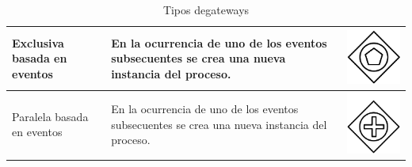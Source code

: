 \begin{table}[H]
\begin{tabular}{|p{2cm}|p{9.5cm}|p{1.7cm} |}
		
		\hline
		{\small Exclusiva basada en eventos } & {\small En la ocurrencia de uno de los eventos subsecuentes se crea una nueva instancia del proceso.} & \vspace{0.5mm} \hspace{2mm} \includegraphics[scale=0.1]{Capitulo2/imagenes/gatewayEBE} \\
		\hline
		

		{\small Paralela basada en eventos  } & {\small En la ocurrencia de uno de los eventos subsecuentes se crea una nueva instancia del proceso.} & \vspace{0.5mm} \hspace{2.5mm} \includegraphics[scale=0.1]{Capitulo2/imagenes/gatewayPBE} \\
		\hline
	\end{tabular}
		\caption{Tipos degateways}
\label{tabla:Tiposdegateways}
\end{table}

